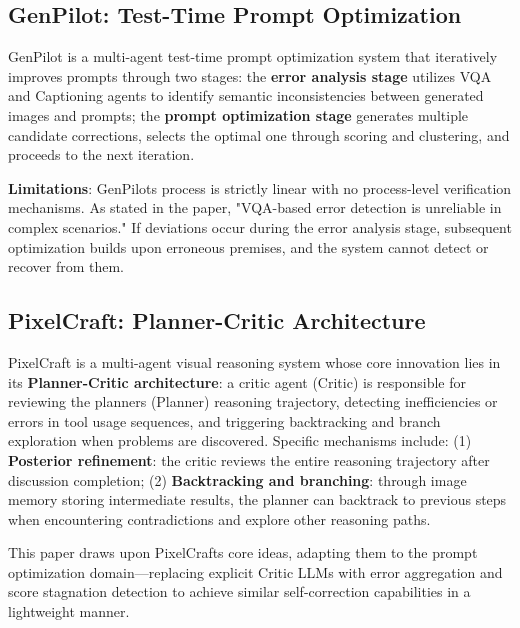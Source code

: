 \documentclass[UTF8]{article} %
\begin{document}
\subsection{GenPilot: Test-Time Prompt
Optimization}\label{genpilot-test-time-prompt-optimization}

GenPilot \cite{ye2025genpilotmultiagenttesttimeprompt} is a multi-agent test-time prompt
optimization system that iteratively improves prompts through two
stages: the \textbf{error analysis stage} utilizes VQA and Captioning
agents to identify semantic inconsistencies between generated images and
prompts; the \textbf{prompt optimization stage} generates multiple
candidate corrections, selects the optimal one through scoring and
clustering, and proceeds to the next iteration.

\textbf{Limitations}: GenPilot\textquotesingle s process is strictly
linear with no process-level verification mechanisms. As stated in the
paper, "VQA-based error detection is unreliable in complex scenarios."
If deviations occur during the error analysis stage, subsequent
optimization builds upon erroneous premises, and the system cannot
detect or recover from them.

\subsection{PixelCraft: Planner-Critic
Architecture}\label{pixelcraft-planner-critic-architecture}

PixelCraft \cite{zhang2025pixelcraftmultiagenthighfidelityvisual} 
is a multi-agent visual reasoning system
whose core innovation lies in its \textbf{Planner-Critic architecture}:
a critic agent (Critic) is responsible for reviewing the
planner\textquotesingle s (Planner) reasoning trajectory, detecting
inefficiencies or errors in tool usage sequences, and triggering
backtracking and branch exploration when problems are discovered.
Specific mechanisms include: (1) \textbf{Posterior refinement}: the
critic reviews the entire reasoning trajectory after discussion
completion; (2) \textbf{Backtracking and branching}: through image
memory storing intermediate results, the planner can backtrack to
previous steps when encountering contradictions and explore other
reasoning paths.

This paper draws upon PixelCraft\textquotesingle s core ideas, adapting
them to the prompt optimization domain---replacing explicit Critic LLMs
with error aggregation and score stagnation detection to achieve similar
self-correction capabilities in a lightweight manner.
\end{document}
